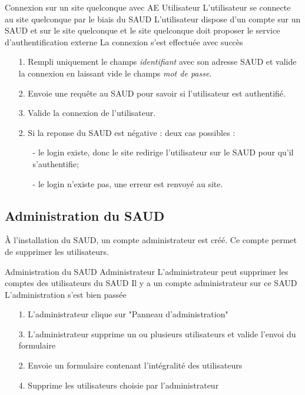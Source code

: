\documentclass[a4paper,11pt,french]{article}
\begin{document}
\fiche
	{Connexion sur un site quelconque avec AE}
	{Utilisateur}
	{L'utilisateur se connecte au site quelconque par le biais du SAUD}
	{L'utilisateur dispose d'un compte sur un SAUD et sur le site quelconque et le site quelconque doit proposer le service d'authentification externe}
	{}
	{La connexion s'est effectuée avec succès}
	{\begin{itemize}
        \item[]
		\item[1.] Rempli uniquement le champs \emph{identifiant} avec
        son adresse SAUD et valide la connexion en laissant vide
        le champs \emph{mot de passe}.
	\end{itemize}
	}
	{\begin{itemize}
        \item[]
		\item[2.] Envoie une requête au SAUD pour savoir si l'utilisateur est authentifié.
        \item[3.] Valide la connexion de l'utilisateur.
	\end{itemize}
	}
	{}
\flots
    {}
	{\begin{itemize}
    \item[]
    \item[2.] Si la reponse du SAUD est négative : deux cas possibles : 
	\begin{itemize}
	\item[-]le login existe, donc le site redirige l'utilisateur sur le SAUD pour qu'il s'authentifie;
	\item[-]le login n'existe pas, une erreur est renvoyé au site.
	\end{itemize}
    \end{itemize}
    }

\subsection{Administration du SAUD}
À l'installation du SAUD, un  compte administrateur est créé. Ce compte permet 
de supprimer les utilisateurs.

\fiche
	{Administration du SAUD}
	{Administrateur}
	{L'administrateur peut supprimer les comptes des utilisateurs du SAUD}
	{Il y a un compte administrateur sur ce SAUD}
	{}
	{L'administration s'est bien passée}
	{\begin{itemize}
        \item[]
		\item[1.] L'administrateur clique sur "Panneau d'administration"
		\item[3.] L'administrateur supprime un ou plusieurs utilisateurs et valide
		l'envoi du formulaire
	\end{itemize}
	}
	{\begin{itemize}
        \item[]
		\item[2.] Envoie un formulaire contenant l'intégralité des utilisateurs
        \item[4.] Supprime les utilisateurs choisie par l'administrateur
	\end{itemize}
	}
	{}
\flots
    {}
	{}
\end{document}
